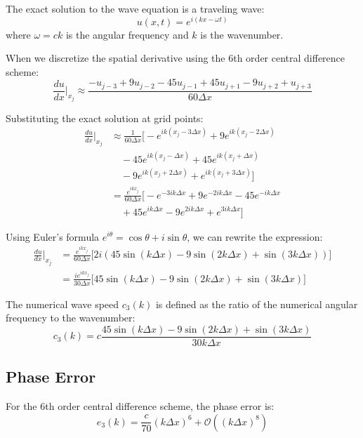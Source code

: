 \documentclass[a4paper, 12pt]{article}
\begin{document}
The exact solution to the wave equation is a traveling wave:
\begin{equation}
    u(x,t) = e^{i(kx - \omega t)}
\end{equation}
where $\omega = ck$ is the angular frequency and $k$ is the wavenumber.

When we discretize the spatial derivative using the 6th order central difference scheme:
\begin{equation}
    \frac{du}{dx}\Big|_{x_j} \approx \frac{-u_{j-3} + 9u_{j-2} - 45u_{j-1} + 45u_{j+1} - 9u_{j+2} + u_{j+3}}{60\Delta x}
\end{equation}

Substituting the exact solution at grid points:
\begin{align*}
    \frac{du}{dx}\Big|_{x_j} &\approx \frac{1}{60\Delta x}\Big[-e^{ik(x_j-3\Delta x)} + 9e^{ik(x_j-2\Delta x)} \\
    &\quad - 45e^{ik(x_j-\Delta x)} + 45e^{ik(x_j+\Delta x)} \\
    &\quad - 9e^{ik(x_j+2\Delta x)} + e^{ik(x_j+3\Delta x)}\Big] \\
    &= \frac{e^{ikx_j}}{60\Delta x} \Big[-e^{-3ik\Delta x} + 9e^{-2ik\Delta x} - 45e^{-ik\Delta x} \\
    &\quad + 45e^{ik\Delta x} - 9e^{2ik\Delta x} + e^{3ik\Delta x}\Big]
\end{align*}

Using Euler's formula $e^{i\theta} = \cos\theta + i\sin\theta$, we can rewrite the expression:
\begin{align*}
    \frac{du}{dx}\Big|_{x_j} &= \frac{e^{ikx_j}}{60\Delta x} \Big[2i(45\sin(k\Delta x) - 9\sin(2k\Delta x) + \sin(3k\Delta x))\Big] \\
    &= \frac{ie^{ikx_j}}{30\Delta x} \Big[45\sin(k\Delta x) - 9\sin(2k\Delta x) + \sin(3k\Delta x)\Big]
\end{align*}

The numerical wave speed $c_3(k)$ is defined as the ratio of the numerical angular frequency to the wavenumber:
\begin{equation}
    c_3(k) = c \frac{45\sin(k\Delta x) - 9\sin(2k\Delta x) + \sin(3k\Delta x)}{30k\Delta x}
\end{equation}

\subsection*{Phase Error}

For the 6th order central difference scheme, the phase error is:
\begin{equation}
    e_3(k) = \frac{c}{70}(k\Delta x)^6 + \mathcal{O}((k\Delta x)^8)
\end{equation}
\end{document}
